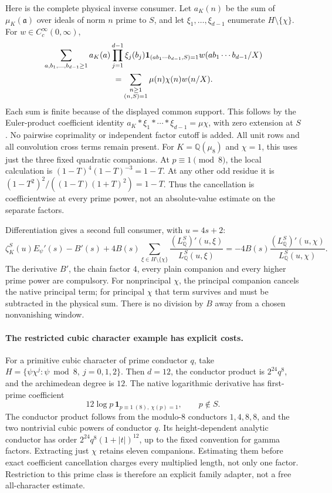 Here is the complete physical inverse consumer. Let \(a_K(n)\) be
the sum of \(\mu_K(\mathfrak a)\) over ideals of norm \(n\) prime to
\(S\), and let \(\xi_1,\ldots,\xi_{d-1}\) enumerate
\(H\setminus\{\chi\}\). For \(w\in C_c^\infty(0,\infty)\),
\begin{align*}
 &\sum_{a,b_1,\ldots,b_{d-1}\ge1}
   a_K(a)\prod_{j=1}^{d-1}\xi_j(b_j)
   \mathbf1_{(ab_1\cdots b_{d-1},S)=1}
   w(ab_1\cdots b_{d-1}/X)\\
 &\hspace{30mm}=\sum_{\substack{n\ge1\\(n,S)=1}}
      \mu(n)\chi(n)w(n/X).
\end{align*}
Each sum is finite because of the displayed common support.
This follows by the Euler-product coefficient identity
\(a_K*\xi_1*\cdots*\xi_{d-1}=\mu\chi\), with zero extension at
\(S\). No pairwise coprimality or independent factor cutoff is added.
All unit rows and all convolution cross terms remain present.
For \(K=\mathbb Q(\mu_8)\) and \(\chi=1\), this uses just the three
fixed quadratic companions. At \(p\equiv1\pmod8\), the local
calculation is \((1-T)^4(1-T)^{-3}=1-T\). At any other odd
residue it is
\((1-T^2)^2/((1-T)(1+T)^2)=1-T\).
Thus the cancellation is coefficientwise at every prime power,
not an absolute-value estimate on the separate factors.

Differentiation gives a second full consumer, with \(u=4s+2\):
\begin{equation}\label{eq:sp4-signed-log-extraction}
 \zeta_K^S(u)E_\psi'(s)-B'(s)
 +4B(s)\sum_{\xi\in H\setminus\{\chi\}}
       \frac{(L_{\mathbb Q}^S)'(u,\xi)}{L_{\mathbb Q}^S(u,\xi)}
 =-4B(s)\frac{(L_{\mathbb Q}^S)'(u,\chi)}
                    {L_{\mathbb Q}^S(u,\chi)}.
\end{equation}
The derivative \(B'\), the chain factor \(4\), every plain companion
and every higher prime power are compulsory. For nonprincipal \(\chi\),
the principal companion cancels the native principal term; for principal
\(\chi\) that term survives and must be subtracted in the physical sum.
There is no division by \(B\) away from a chosen nonvanishing window.

\paragraph{The restricted cubic character example has explicit costs.}
For a primitive cubic character of prime conductor \(q\), take
\(H=\{\psi\chi^j:\psi\bmod8,\ j=0,1,2\}\). Then
\(d=12\), the conductor product is \(2^{24}q^8\), and the
archimedean degree is \(12\). The native logarithmic derivative has
first-prime coefficient
\[
 12\log p\,\mathbf1_{p\equiv1\ (8),\ \chi(p)=1},\qquad p\notin S.
\]
The conductor product follows from the modulo-\(8\) conductors
\(1,4,8,8\), and the two nontrivial cubic powers of conductor \(q\).
Its height-dependent analytic conductor has order
\(2^{24}q^8(1+|t|)^{12}\), up to the fixed convention for gamma factors.
Extracting just \(\chi\) retains eleven companions. Estimating them
before exact coefficient cancellation charges every multiplied length,
not only one factor. Restriction to this prime class is therefore an
explicit family adapter, not a free all-character estimate.

